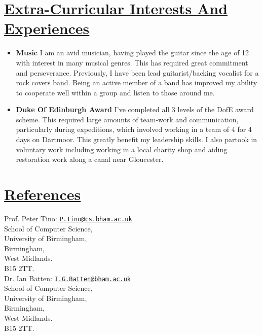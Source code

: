\documentclass[11pt]{article}
\begin{document}
	\vspace{-20pt}
	\hspace{-100pt}\section*{\underline{Extra-Curricular Interests And Experiences}}
			\begin{itemize}
				\item \textbf{Music} I am an avid musician, having played the guitar since the age of 12 with interest in many musical genres. This has required great commitment and perseverance. Previously, I have been lead guitarist/backing vocalist for a rock covers band. Being an active member of a band has improved my ability to cooperate well within a group and listen to those around me. 
				\item \textbf{Duke Of Edinburgh Award} I've completed all 3 levels of the DofE award scheme. This required large amounts of team-work and communication, particularly during expeditions, which involved working in a team of 4 for 4 days on Dartmoor. This greatly benefit my leadership skills. I also partook in voluntary work including working in a local charity shop and aiding restoration work along a canal near Gloucester.
			\end{itemize}

				
	\vspace{-20pt}
	\hspace{-100pt}\section*{\underline{References}}	
				\begin{multicols}{2}
					\noindent
					Prof. Peter Tino:  \href{mailto:P.Tino@cs.bham.ac.uk}{\nolinkurl{P.Tino@cs.bham.ac.uk}}\\
					School of Computer Science,\\
					University of Birmingham,\\
					Birmingham, \\
					West Midlands.\\
					B15 2TT.\\
	
					\noindent
					Dr. Ian Batten: \href{mailto:I.G.Batten@bham.ac.uk}{\nolinkurl{I.G.Batten@bham.ac.uk}}\\
					School of Computer Science,\\
					University of Birmingham,\\
					Birmingham,\\
					West Midlands.\\
					B15 2TT.\\
				\end{multicols}
\end{document}
